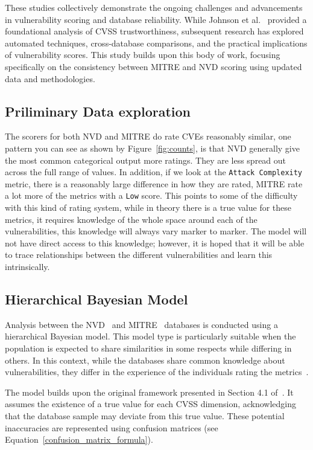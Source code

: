 \documentclass[12pt]{article}
\begin{document}
These studies collectively demonstrate the ongoing challenges and advancements in vulnerability
scoring and database reliability. While Johnson et al.~\cite{bayes} provided a foundational analysis
of CVSS trustworthiness, subsequent research has explored automated techniques, cross-database
comparisons, and the practical implications of vulnerability scores. This study builds upon
this body of work, focusing specifically on the consistency between MITRE and NVD scoring using
updated data and methodologies.

\subsection{Priliminary Data exploration}

The scorers for both NVD and MITRE do rate CVEs reasonably similar, one pattern you can see as shown
by Figure~\ref{fig:counts}, is that NVD generally give the most common categorical output more ratings.
They are less spread out across the full range of values. In addition, if we look at the
\texttt{Attack Complexity} metric, there is a reasonably large difference in how they are rated,
MITRE rate a lot more of the metrics with a \texttt{Low} score. This points to some of the
difficulty with this kind of rating system, while in theory there is a true value for these metrics,
it requires knowledge of the whole space around each of the vulnerabilities, this knowledge will
always vary marker to marker. The model will not have direct access to this knowledge; however, it
is hoped that it will be able to trace relationships between the different vulnerabilities and learn
this intrinsically.

\subsection{Hierarchical Bayesian Model} \label{bayesian_modeling}

Analysis between the NVD~\cite{NVD} and MITRE~\cite{MITRE} databases is conducted using a
hierarchical Bayesian model. This model type is particularly suitable when the population is
expected to share similarities in some respects while differing in others. In this context, while
the databases share common knowledge about vulnerabilities, they differ in the experience of the
individuals rating the metrics~\cite{bayes}.

The model builds upon the original framework presented in Section 4.1 of~\cite{bayes}. It assumes
the existence of a true value for each CVSS dimension, acknowledging that the database sample may
deviate from this true value. These potential inaccuracies are represented using confusion matrices
(see Equation~\ref{confusion_matrix_formula}).
\end{document}
